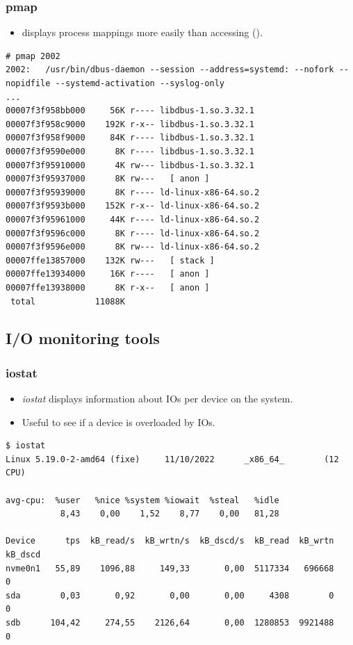 \begin{frame}[fragile]
  \frametitle{pmap}
  \begin{itemize}
    \item {} displays process mappings more easily than
          accessing  ().
  \end{itemize}
  \begin{block}{}
    \begin{verbatim}
# pmap 2002
2002:   /usr/bin/dbus-daemon --session --address=systemd: --nofork --nopidfile --systemd-activation --syslog-only
...
00007f3f958bb000     56K r---- libdbus-1.so.3.32.1
00007f3f958c9000    192K r-x-- libdbus-1.so.3.32.1
00007f3f958f9000     84K r---- libdbus-1.so.3.32.1
00007f3f9590e000      8K r---- libdbus-1.so.3.32.1
00007f3f95910000      4K rw--- libdbus-1.so.3.32.1
00007f3f95937000      8K rw---   [ anon ]
00007f3f95939000      8K r---- ld-linux-x86-64.so.2
00007f3f9593b000    152K r-x-- ld-linux-x86-64.so.2
00007f3f95961000     44K r---- ld-linux-x86-64.so.2
00007f3f9596c000      8K r---- ld-linux-x86-64.so.2
00007f3f9596e000      8K rw--- ld-linux-x86-64.so.2
00007ffe13857000    132K rw---   [ stack ]
00007ffe13934000     16K r----   [ anon ]
00007ffe13938000      8K r-x--   [ anon ]
 total            11088K
    \end{verbatim}
  \end{block}
\end{frame}

\subsection{I/O monitoring tools}

\begin{frame}[fragile]
  \frametitle{iostat}
  \begin{itemize}
    \item {\em iostat} displays information about IOs per device on the system.
    \item Useful to see if a device is overloaded by IOs.
  \end{itemize}
  \begin{block}{}
    \begin{verbatim}
$ iostat
Linux 5.19.0-2-amd64 (fixe)     11/10/2022      _x86_64_        (12 CPU)

avg-cpu:  %user   %nice %system %iowait  %steal   %idle
           8,43    0,00    1,52    8,77    0,00   81,28

Device      tps  kB_read/s  kB_wrtn/s  kB_dscd/s  kB_read  kB_wrtn  kB_dscd
nvme0n1   55,89    1096,88     149,33       0,00  5117334   696668        0
sda        0,03       0,92       0,00       0,00     4308        0        0
sdb      104,42     274,55    2126,64       0,00  1280853  9921488        0
    \end{verbatim}
  \end{block}
\end{frame}


